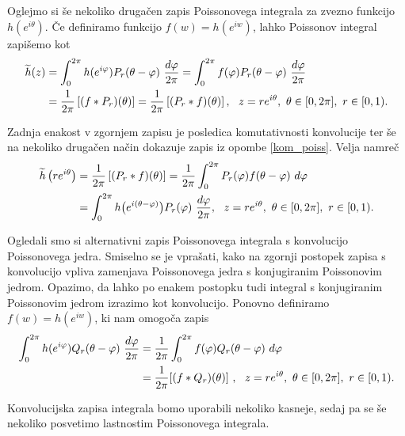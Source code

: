 \documentclass[mat1, tisk]{fmfdelo}
\begin{document}
    Oglejmo si še nekoliko drugačen zapis Poissonovega integrala za zvezno funkcijo $h(e^{i \theta})$.
    Če definiramo funkcijo $f(w) = h(e^{iw})$, lahko Poissonov integral zapišemo kot
    \begin{align}
        \label{konv_Pr}
        \widetilde{h}(z) &= \int_{0}^{2\pi}{h(e^{i\varphi}) P_r(\theta - \varphi)~\frac{d\varphi}{2 \pi}} = \int_{0}^{2\pi}{f(\varphi) P_r(\theta - \varphi)~\frac{d\varphi}{2 \pi}} \notag \\
        & = \frac{1}{2\pi} \left[(f * P_r)(\theta)\right] = \frac{1}{2\pi} \left[(P_r * f)(\theta)\right],~~z = r e^{i\theta},~\theta \in [0,2\pi],~r\in[0,1).
    \end{align}
    \begin{opomba}
        Zadnja enakost v zgornjem zapisu je posledica komutativnosti konvolucije ter še na nekoliko drugačen način dokazuje zapis iz opombe \ref{kom_poiss}. Velja namreč
        \begin{align*}
            \widetilde{h}\left(r e^{i \theta}\right) &= \frac{1}{2\pi} \left[(P_r * f)(\theta)\right] =  \frac{1}{2 \pi}\int_{0}^{2\pi}{P_r(\varphi) f(\theta - \varphi) ~d\varphi} \\
            & = \int_{0}^{2\pi}{h\big(e^{i(\theta-\varphi)}\big) P_r(\varphi)~\frac{d\varphi}{2 \pi}},~~z = r e^{i\theta},~\theta \in [0,2\pi],~r\in[0,1). \notag
        \end{align*}
    \end{opomba}

    Ogledali smo si alternativni zapis Poissonovega integrala s konvolucijo Poissonovega jedra. Smiselno se je vprašati, kako na zgornji postopek zapisa s konvolucijo vpliva zamenjava Poissonovega jedra s konjugiranim Poissonovim jedrom. Opazimo, da lahko po enakem postopku tudi integral s konjugiranim Poissonovim jedrom izrazimo kot konvolucijo. 
    Ponovno definiramo $f(w) = h(e^{i w})$, ki nam omogoča zapis
    \begin{align}
        \label{konv_Qr}
        \int_{0}^{2\pi}{h(e^{i\varphi}) Q_r(\theta - \varphi)~\frac{d\varphi}{2 \pi}}  &= \frac{1}{2\pi}\int_{0}^{2 \pi}{f(\varphi) Q_r(\theta - \varphi)~d\varphi} \\ 
        &= \frac{1}{2 \pi}[(f * Q_r)(\theta)]~,~~z = r e^{i\theta},~\theta \in [0,2\pi],~r\in[0,1). \notag
    \end{align}
    
    Konvolucijska zapisa integrala bomo uporabili nekoliko kasneje, sedaj pa se še nekoliko posvetimo lastnostim Poissonovega integrala.
\end{document}
